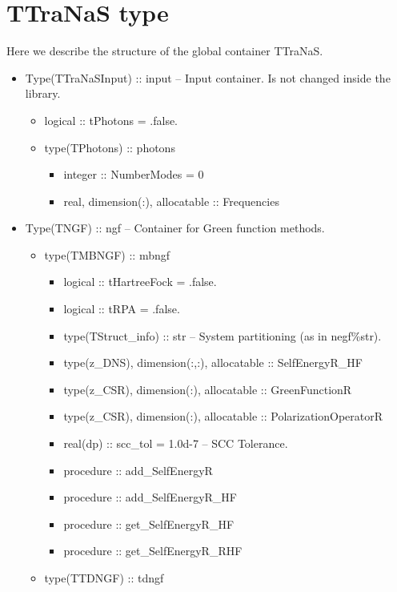 \documentclass[a4paper,11pt,english]{sphinxmanual}
\begin{document}
{{\section{{\sffamily TTraNaS} type}

Here we describe the structure of the global container {\sffamily TTraNaS}.

\begin{itemize}

  \item {\sf Type(TTraNaSInput) :: input} -- Input container. Is not changed inside the library.
  \begin{itemize} 
    \item {\sf logical :: tPhotons = .false.}
    \item {\sf type(TPhotons) :: photons}
    \begin{itemize} 
      \item {\sf integer :: NumberModes = 0}
      \item {\sf real, dimension(:), allocatable :: Frequencies}
    \end{itemize}
  \end{itemize}
  
  \item {\sf Type(TNGF) :: ngf} -- Container for Green function methods.

  \begin{itemize} 
    \item {\sf type(TMBNGF) :: mbngf}
    \begin{itemize} 
      \item {\sf logical :: tHartreeFock = .false.}
      \item {\sf logical :: tRPA = .false.}
      \item {\sf type(TStruct\_info) :: str} -- System partitioning (as in negf{\%}str).
      \item {\sf type(z\_DNS), dimension(:,:), allocatable :: SelfEnergyR\_HF}
      \item {\sf type(z\_CSR), dimension(:), allocatable :: GreenFunctionR}
      \item {\sf type(z\_CSR), dimension(:), allocatable :: PolarizationOperatorR}
      \item {\sf real(dp) :: scc\_tol = 1.0d-7} -- SCC Tolerance.
      \item {\sf procedure :: add\_SelfEnergyR}
      \item {\sf procedure :: add\_SelfEnergyR\_HF}
      \item {\sf procedure :: get\_SelfEnergyR\_HF}
      \item {\sf procedure :: get\_SelfEnergyR\_RHF}
    \end{itemize}
    \item {\sf type(TTDNGF) :: tdngf}
  \end{itemize} 
    

\end{itemize}}}
\end{document}

